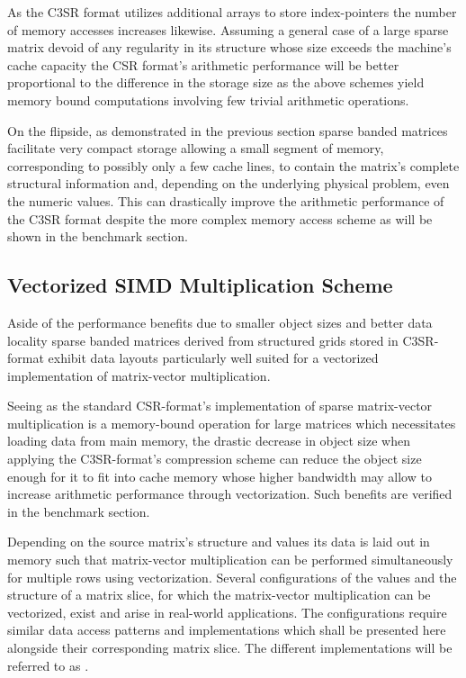       As the C3SR format utilizes additional arrays to store index-pointers the number of memory accesses increases
      likewise. Assuming a general case of a large sparse matrix devoid of any regularity in its structure whose size
      exceeds the machine's cache capacity the CSR format's arithmetic performance will be better proportional to the
      difference in the storage size as the above schemes yield memory bound computations involving few trivial
      arithmetic operations.

      On the flipside, as demonstrated in the previous section sparse banded matrices facilitate very compact storage
      allowing a small segment of memory, corresponding to possibly only a few cache lines, to contain the matrix's
      complete structural information and, depending on the underlying physical problem, even the numeric values. This
      can drastically improve the arithmetic performance of the C3SR format despite the more complex memory access
      scheme as will be shown in the benchmark section.

    \subsection{Vectorized SIMD Multiplication Scheme} \label{sec:vectorized-simd-multiplication-scheme}

      Aside of the performance benefits due to smaller object sizes and better data locality sparse banded matrices
      derived from structured grids stored in C3SR-format exhibit data layouts particularly well suited for a vectorized
      implementation of matrix-vector multiplication.

      Seeing as the standard CSR-format's implementation of sparse matrix-vector multiplication is a memory-bound
      operation for large matrices which necessitates loading data from main memory, the drastic decrease in object size
      when applying the C3SR-format's compression scheme can reduce the object size enough for it to fit into cache
      memory whose higher bandwidth may allow to increase arithmetic performance through vectorization. Such
      benefits are verified in the benchmark section.

      Depending on the source matrix's structure and values its data is laid out in memory such that matrix-vector
      multiplication can be performed simultaneously for multiple rows using vectorization. Several configurations of
      the values and the structure of a matrix slice, for which the matrix-vector multiplication can be vectorized,
      exist and arise in real-world applications. The configurations require similar data access patterns and
      implementations which shall be presented here alongside their corresponding matrix slice. The different
      implementations will be referred to as .

